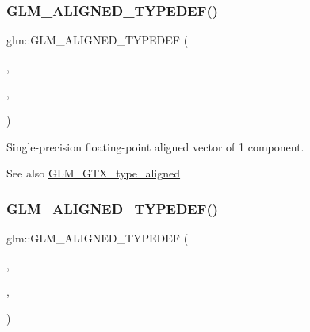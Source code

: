 \subsubsection{\texorpdfstring{G\+L\+M\+\_\+\+A\+L\+I\+G\+N\+E\+D\+\_\+\+T\+Y\+P\+E\+D\+E\+F()}{GLM\_ALIGNED\_TYPEDEF()}\hspace{0.1cm}{\footnotesize\ttfamily [151/209]}}
{\footnotesize\ttfamily glm\+::\+G\+L\+M\+\_\+\+A\+L\+I\+G\+N\+E\+D\+\_\+\+T\+Y\+P\+E\+D\+EF (\begin{DoxyParamCaption}\item[{\hyperlink{group__gtc__type__precision_ga6fb588b465f2252b473582159c31c40c}{f32vec1}}]{,  }\item[{aligned\+\_\+f32vec1}]{,  }\item[{4}]{ }\end{DoxyParamCaption})}

Single-\/precision floating-\/point aligned vector of 1 component. \begin{DoxySeeAlso}{See also}
\hyperlink{group__gtx__type__aligned}{G\+L\+M\+\_\+\+G\+T\+X\+\_\+type\+\_\+aligned} 
\end{DoxySeeAlso}
\mbox{\label{group__gtx__type__aligned_ga5e185865a2217d0cd47187644683a8c3}} 
\subsubsection{\texorpdfstring{G\+L\+M\+\_\+\+A\+L\+I\+G\+N\+E\+D\+\_\+\+T\+Y\+P\+E\+D\+E\+F()}{GLM\_ALIGNED\_TYPEDEF()}\hspace{0.1cm}{\footnotesize\ttfamily [152/209]}}
{\footnotesize\ttfamily glm\+::\+G\+L\+M\+\_\+\+A\+L\+I\+G\+N\+E\+D\+\_\+\+T\+Y\+P\+E\+D\+EF (\begin{DoxyParamCaption}\item[{\hyperlink{group__gtc__type__precision_ga8681dee3524dea86388178c49c27079a}{f32vec2}}]{,  }\item[{aligned\+\_\+f32vec2}]{,  }\item[{8}]{ }\end{DoxyParamCaption})}

